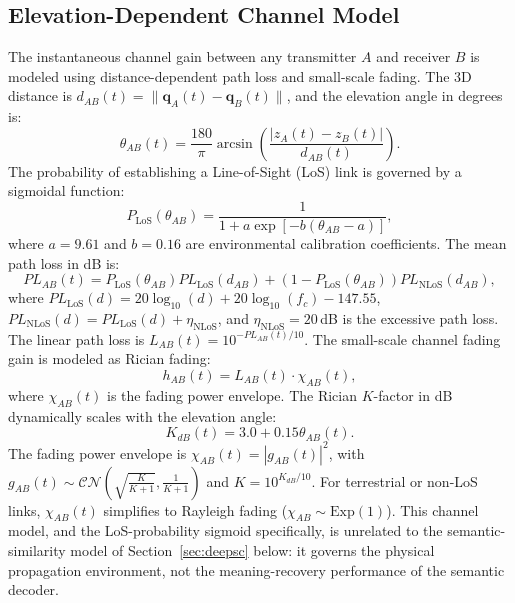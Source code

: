 \documentclass[journal,onecolumn]{IEEEtran}
\begin{document}
\subsection{Elevation-Dependent Channel Model}
The instantaneous channel gain between any transmitter $A$ and receiver $B$ is modeled using distance-dependent path loss and small-scale fading. The 3D distance is $d_{AB}(t) = \|\mathbf{q}_A(t) - \mathbf{q}_B(t)\|$, and the elevation angle in degrees is:
\begin{equation}
    \theta_{AB}(t) = \frac{180}{\pi} \arcsin\left( \frac{|z_A(t) - z_B(t)|}{d_{AB}(t)} \right).
\end{equation}
The probability of establishing a Line-of-Sight (LoS) link is governed by a sigmoidal function:
\begin{equation}
    P_{\text{LoS}}(\theta_{AB}) = \frac{1}{1 + a \exp\left[-b\left(\theta_{AB} - a\right)\right]},
\end{equation}
where $a = 9.61$ and $b = 0.16$ are environmental calibration coefficients. The mean path loss in dB is:
\begin{equation}
    PL_{AB}(t) = P_{\text{LoS}}(\theta_{AB}) PL_{\text{LoS}}(d_{AB}) + (1 - P_{\text{LoS}}(\theta_{AB})) PL_{\text{NLoS}}(d_{AB}),
\end{equation}
where $PL_{\text{LoS}}(d) = 20\log_{10}(d) + 20\log_{10}(f_c) - 147.55$, $PL_{\text{NLoS}}(d) = PL_{\text{LoS}}(d) + \eta_{\text{NLoS}}$, and $\eta_{\text{NLoS}} = 20$\,dB is the excessive path loss. The linear path loss is $L_{AB}(t) = 10^{-PL_{AB}(t)/10}$.
The small-scale channel fading gain is modeled as Rician fading:
\begin{equation}
    h_{AB}(t) = L_{AB}(t) \cdot \chi_{AB}(t),
\end{equation}
where $\chi_{AB}(t)$ is the fading power envelope. The Rician $K$-factor in dB dynamically scales with the elevation angle:
\begin{equation}
    K_{dB}(t) = 3.0 + 0.15 \theta_{AB}(t).
\end{equation}
The fading power envelope is $\chi_{AB}(t) = |g_{AB}(t)|^2$, with $g_{AB}(t) \sim \mathcal{CN}(\sqrt{\frac{K}{K+1}}, \frac{1}{K+1})$ and $K = 10^{K_{dB}/10}$. For terrestrial or non-LoS links, $\chi_{AB}(t)$ simplifies to Rayleigh fading ($\chi_{AB} \sim \text{Exp}(1)$). This channel model, and the LoS-probability sigmoid specifically, is unrelated to the semantic-similarity model of Section~\ref{sec:deepsc} below: it governs the physical propagation environment, not the meaning-recovery performance of the semantic decoder.
\end{document}
